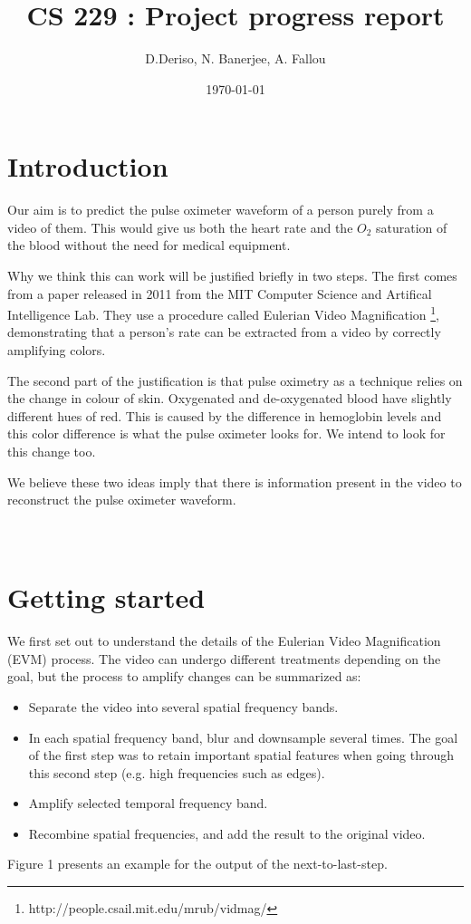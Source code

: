 \documentclass[12pt]{article}
\begin{document}
  \title{CS 229 : Project progress report}
  \author{D.Deriso, N. Banerjee, A. Fallou}
  \date{\today}
  \maketitle
  \thispagestyle{empty}

\section*{Introduction}
%
\small  
Our aim is to predict the pulse oximeter waveform of a person purely from a video of them. 
This would give us both the heart rate and the $O_2$ saturation of the blood without the need for medical equipment.

Why we think this can work will be justified briefly in two steps. 
The first comes from a paper released in 2011 from the MIT Computer Science and Artifical Intelligence Lab. 
They use a procedure called Eulerian Video Magnification \footnote{http://people.csail.mit.edu/mrub/vidmag/},
demonstrating that a person's rate can be extracted from a video by correctly amplifying colors.

The second part of the justification is that pulse oximetry as a technique relies on the change in colour of skin. 
Oxygenated and de-oxygenated blood have slightly different hues of red.
This is caused by the difference in hemoglobin levels and this color difference is what the pulse oximeter looks for. 
We intend to look for this change too.

We believe these two ideas imply that there is information present in the video to reconstruct the pulse oximeter waveform.\\
\\
\\
\section{Getting started}

  We first set out to understand the details of the Eulerian Video Magnification (EVM) process. The video can undergo different treatments depending on the goal, but the process to amplify changes 
  can be summarized as:

  \begin{itemize}
    \item Separate the video into several spatial frequency bands.
    \item In each spatial frequency band, blur and downsample several times. The goal of the first step was to retain important spatial features when going through this second step (e.g. high frequencies such as edges).
    \item Amplify selected temporal frequency band.
    \item Recombine spatial frequencies, and add the result to the original video.
  \end{itemize}
  Figure 1 presents an example for the output of the next-to-last-step. 
\end{document}
